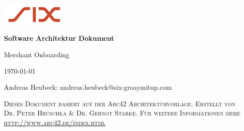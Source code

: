 \graphicspath{{./images/}}

\begin{titlepage}
	\raggedleft
	\includegraphics[width=0.25\textwidth]{sixlogo.png}\par\vspace{1cm}
	\raggedright
	\vspace{2cm}
	{\huge\bfseries Software Architektur Dokument\par}
	\vspace{1cm}
	{\huge Merchant Onboarding\par}
	\vspace{1cm}
	{\large \today\par}
	\vspace{0.5cm}
	{\large Andreas Heubeck: andreas.heubeck@six-groaymitup.com\par}
	\vfill
	\vspace{8cm}
	\textsc{Dieses Dokument basiert auf der Arc42 Architekturvorlage. Erstellt von Dr. Peter Hruschka \& Dr. Gernot Starke. Für weitere Informationen siehe \url{http://www.arc42.de/index.html}}\par
	\vfill
\end{titlepage}
